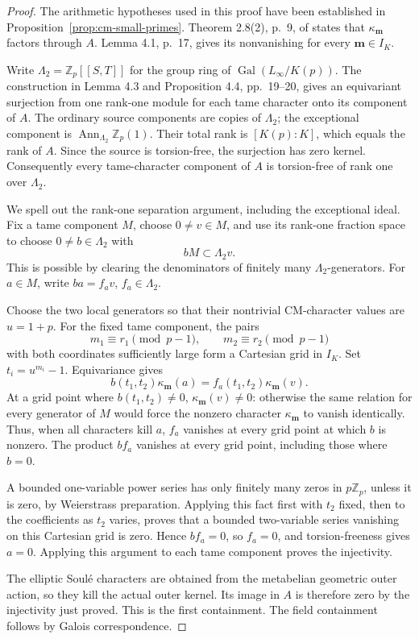 \documentclass[11pt]{article}
\theoremstyle{definition}\newtheorem{definition}[theorem]{Definition}
\begin{document}
\begin{proof}
The arithmetic hypotheses used in this proof have been
established in Proposition~\ref{prop:cm-small-primes}.
Theorem 2.8(2), p.~9, of \cite{Ishii} states that
\(\kappa_{\boldsymbol m}\) factors through \(A\).
Lemma 4.1, p.~17, gives its nonvanishing for every
\(\boldsymbol m\in I_K\).

Write \(\Lambda_2=\mathbb Z_p[[S,T]]\) for the group ring
of \(\operatorname{Gal}(L_\infty/K(p))\). The construction
in Lemma 4.3 and Proposition 4.4, pp.~19--20, gives an
equivariant surjection from one rank-one module for each
tame character onto its component of \(A\). The ordinary
source components are copies of \(\Lambda_2\); the exceptional
component is \(\operatorname{Ann}_{\Lambda_2}\mathbb Z_p(1)\).
Their total rank is \([K(p):K]\), which equals the rank of \(A\).
Since the source is torsion-free, the surjection has zero
kernel. Consequently every tame-character component of \(A\)
is torsion-free of rank one over \(\Lambda_2\).

We spell out the rank-one separation argument, including the
exceptional ideal. Fix a tame component \(M\), choose
\(0\ne v\in M\), and use its rank-one fraction space to choose
\(0\ne b\in\Lambda_2\) with
\[
 bM\subset\Lambda_2v .
\]
This is possible by clearing the denominators of finitely
many \(\Lambda_2\)-generators. For \(a\in M\), write
\(ba=f_av\), \(f_a\in\Lambda_2\).

Choose the two local generators so that their nontrivial
CM-character values are \(u=1+p\). For the fixed tame
component, the pairs
\[
 m_1\equiv r_1\pmod{p-1},\qquad
 m_2\equiv r_2\pmod{p-1}
\]
with both coordinates sufficiently large form a Cartesian
grid in \(I_K\). Set \(t_i=u^{m_i}-1\).
Equivariance gives
\[
 b(t_1,t_2)\kappa_{\boldsymbol m}(a)
       =f_a(t_1,t_2)\kappa_{\boldsymbol m}(v).
\]
At a grid point where \(b(t_1,t_2)\ne0\),
\(\kappa_{\boldsymbol m}(v)\ne0\): otherwise the same relation
for every generator of \(M\) would force the nonzero character
\(\kappa_{\boldsymbol m}\) to vanish identically.
Thus, when all characters kill \(a\), \(f_a\) vanishes at
every grid point at which \(b\) is nonzero. The product
\(bf_a\) vanishes at every grid point, including those where
\(b=0\).

A bounded one-variable power series has only finitely many
zeros in \(p\mathbb Z_p\), unless it is zero, by Weierstrass
preparation. Applying this fact first with \(t_2\) fixed,
then to the coefficients as \(t_2\) varies, proves that a
bounded two-variable series vanishing on this Cartesian
grid is zero. Hence \(bf_a=0\), so \(f_a=0\), and
torsion-freeness gives \(a=0\). Applying this argument to
each tame component proves the injectivity.

The elliptic Soul\'e characters are obtained from the
metabelian geometric outer action, so they kill the actual
outer kernel. Its image in \(A\) is therefore zero by the
injectivity just proved. This is the first containment.
The field containment follows by Galois correspondence.
\end{proof}
\end{document}
